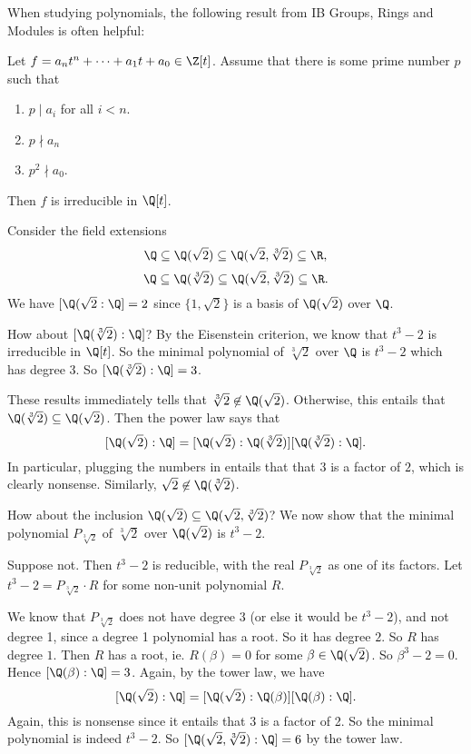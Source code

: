 \documentclass[a4paper]{article}
\begin{document}
When studying polynomials, the following result from IB Groups, Rings and Modules is often helpful:
\begin{prop}
  Let $f = a_nt^n + \cdots + a_1 t + a_0\in \Z[t]$. Assume that there is some prime number $p$ such that
  \begin{enumerate}
    \item $ p \mid a_i$ for all $i < n$.
    \item $p \nmid a_n$
    \item $p^2 \nmid a_0$.
  \end{enumerate}
  Then $f$ is irreducible in $\Q[t]$.
\end{prop}

\begin{eg}
  Consider the field extensions
  \[
    \Q \subseteq \Q(\sqrt{2})\subseteq \Q(\sqrt{2}, \sqrt[3]{2})\subseteq \R,
  \]
  \[
    \Q\subseteq \Q(\sqrt[3]{2}) \subseteq \Q(\sqrt{2}, \sqrt[3]{2})\subseteq \R.
  \]
  We have $[\Q(\sqrt{2}: \Q] = 2$ since $\{1, \sqrt{2}\}$ is a basis of $\Q(\sqrt{2})$ over $\Q$.

  How about $[\Q(\sqrt[3]{2}):\Q]$? By the Eisenstein criterion, we know that $t^3 - 2$ is irreducible in $\Q[t]$. So the minimal polynomial of $\sqrt[3]{2}$ over $\Q$ is $t^3 - 2$ which has degree 3. So $[\Q(\sqrt[3]{2}):\Q] = 3$.

  These results immediately tells that $\sqrt[3]{2}\not\in \Q(\sqrt{2})$. Otherwise, this entails that $\Q(\sqrt[3]{2}) \subseteq \Q(\sqrt{2})$. Then the power law says that
  \[
    [\Q(\sqrt{2}):\Q] = [\Q(\sqrt{2}):\Q(\sqrt[3]{2})][\Q(\sqrt[3]{2}):\Q].
  \]
  In particular, plugging the numbers in entails that that $3$ is a factor of $2$, which is clearly nonsense. Similarly, $\sqrt{2}\not \in \Q(\sqrt[3]{2})$.

  How about the inclusion $\Q(\sqrt{2})\subseteq \Q(\sqrt{2}, \sqrt[3]{2})$? We now show that the minimal polynomial $P_{\sqrt[3]{2}}$ of $\sqrt[3]{2}$ over $\Q(\sqrt{2})$ is $t^3 - 2$.

  Suppose not. Then $t^3 - 2$ is reducible, with the real $P_{\sqrt[3]{2}}$ as one of its factors. Let $t^3 - 2 = P_{\sqrt[3]{2}} \cdot R$ for some non-unit polynomial $R$.

  We know that $P_{\sqrt[3]{2}}$ does not have degree 3 (or else it would be $t^3 - 2$), and not degree 1, since a degree 1 polynomial has a root. So it has degree $2$. So $R$ has degree $1$. Then $R$ has a root, ie. $R(\beta) = 0$ for some $\beta \in \Q(\sqrt{2})$. So $\beta^3 - 2 = 0$. Hence $[\Q(\beta): \Q] = 3$. Again, by the tower law, we have
  \[
    [\Q(\sqrt{2}):\Q] = [\Q(\sqrt{2}):\Q(\beta)][\Q(\beta):\Q].
  \]
  Again, this is nonsense since it entails that 3 is a factor of 2. So the minimal polynomial is indeed $t^3 -2$. So $[\Q(\sqrt{2}, \sqrt[3]{2}):\Q] = 6$ by the tower law.


\end{eg}
\end{document}
